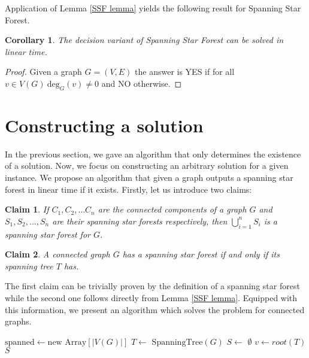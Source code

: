 \documentclass[en]{pracamgr}
\newtheorem{claim}{Claim}
\newtheorem{corollary}{Corollary}
\theoremstyle{definition}
\newcommand{\ssf}{spanning star forest}
\newcommand{\ssfp}{{\sc Spanning Star Forest}}
\newcommand{\degree}[2]{\textrm{deg}_{#1}(#2)}
\begin{document}
Application of Lemma \ref{SSF lemma} yields the following result for \ssfp{}.

\begin{corollary}
	The decision variant of \ssfp{} can be solved in linear time.
\end{corollary}

\begin{proof}
	Given a graph $G = (V,E)$ the answer is YES if for all $v \in V(G)\ \degree{G}{v} \neq 0$ and NO otherwise.
\end{proof}

\section{Constructing a solution}

In the previous section, we gave an algorithm that only determines the existence of a solution. Now, we focus on constructing an arbitrary solution for a given instance. We propose an algorithm that given a graph outputs a spanning star forest in linear time if it exists. Firstly, let us introduce two claims:

\begin{claim} \label{SSF sum}
	If $C_1,C_2,...C_n$ are the connected components of a graph $G$ and $S_1,S_2,...,S_n$ are their \ssf{}s respectively, then $\bigcup\limits_{i=1}^n S_i$ is a \ssf{} for $G$.
\end{claim}

\begin{claim} \label{Spanning tree SSF}
	A connected graph $G$ has a \ssf{} if and only if its spanning tree $T$ has.
\end{claim}

The first claim can be trivially proven by the definition of a \ssf{} while the second one follows directly from Lemma \ref{SSF lemma}. Equipped with this information, we present an algorithm which solves the problem for connected graphs.

\begin{algorithm}\label{alg1}
	\KwOut{\ssf{} of $G$}
	$\textrm{spanned} \leftarrow \textrm{new Array}[|V(G)|]$\;
	$T \leftarrow$ $\textrm{SpanningTree}(G)$\;
	$S \leftarrow$ $\emptyset$\;
	$v \leftarrow root(T)$\;
	\Return $S$\;
	\caption{Obtaining a spanning star forest from a connected graph.}
\end{algorithm}
\end{document}
